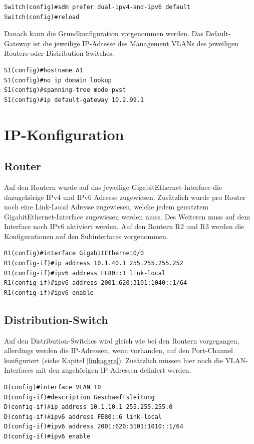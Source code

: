 \documentclass[11pt,a4paper]{scrreprt}
\begin{document}
\begin{lstlisting}[frame=single, captionpos=b,caption= Switch Template Wechsel]
Switch(config)#sdm prefer dual-ipv4-and-ipv6 default
Switch(config)#reload
\end{lstlisting}
\noindent
Danach kann die Grundkonfiguration vorgenommen werden. Das Default-Gateway ist die jeweilige IP-Adresse des Management \acs{VLAN}s des jeweiligen Routers oder Distribution-Switches.
\newline

\begin{lstlisting}[frame=single, captionpos=b,caption= Switch Grund Konfiguration]
S1(config)#hostname A1
S1(config)#no ip domain lookup
S1(config)#spanning-tree mode pvst
S1(config)#ip default-gateway 10.2.99.1
\end{lstlisting}
\newpage
\section{IP-Konfiguration}
\subsection{Router}
Auf den Routern wurde auf das jeweilige GigabitEthernet-Interface die dazugehörige IPv4 und IPv6 Adresse zugewiesen. Zusätzlich wurde pro Router noch eine Link-Local Adresse zugewiesen, welche jedem genutztem GigabitEthernet-Interface zugewiesen werden muss. Des Weiteren muss auf dem Interface noch IPv6 aktiviert werden.
Auf den Routern R2 und R3 werden die Konfigurationen auf den Subinterfaces vorgenommen.
\newline
\begin{lstlisting}[frame=single, captionpos=b,caption= Router IP-Konfiguration]
R1(config)#interface GigabitEthernet0/0
R1(config-if)#ip address 10.1.40.1 255.255.255.252
R1(config-if)#ipv6 address FE80::1 link-local
R1(config-if)#ipv6 address 2001:620:3101:1040::1/64
R1(config-if)#ipv6 enable
\end{lstlisting}

\subsection{Distribution-Switch}
Auf den Distribution-Switches wird gleich wie bei den Routern vorgegangen, allerdings werden die IP-Adressen, wenn vorhanden, auf den Port-Channel konfiguriert (siehe Kapitel \ref{linkaggre}). Zusätzlich müssen hier noch die \acs{VLAN}-Interfaces mit den zugehörigen IP-Adressen definiert werden.
\newline
\begin{lstlisting}[frame=single, captionpos=b,caption= Distribution IP-Konfiguration]
D(config)#interface VLAN 10
D(config-if)#description Geschaeftsleitung
D(config-if)#ip address 10.1.10.1 255.255.255.0
D(config-if)#ipv6 address FE80::6 link-local
D(config-if)#ipv6 address 2001:620:3101:1010::1/64
D(config-if)#ipv6 enable
\end{lstlisting}
\end{document}
